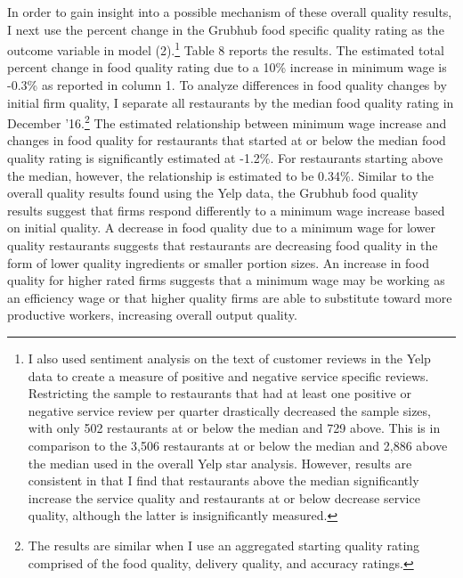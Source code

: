 \documentclass[11pt]{article}
\begin{document}
In order to gain insight into a possible mechanism of these overall quality results, I next use the percent change in the Grubhub food specific quality rating as the outcome variable in model (2).\footnote{I also used sentiment analysis on the text of customer reviews in the Yelp data to create a measure of positive and negative service specific reviews. Restricting the sample to restaurants that had at least one positive or negative service review per quarter drastically decreased the sample sizes, with only 502 restaurants at or below the median and 729 above. This is in comparison to the 3,506 restaurants at or below the median and 2,886 above the median used in the overall Yelp star analysis. However, results are consistent in that I find that restaurants above the median significantly increase the service quality and restaurants at or below decrease service quality, although the latter is insignificantly measured.} Table 8 reports the results. The estimated total percent change in food quality rating due to a 10\% increase in minimum wage is -0.3\% as reported in column 1. To analyze differences in food quality changes by initial firm quality, I separate all restaurants by the median food quality rating in December '16.\footnote{The results are similar when I use an aggregated starting quality rating comprised of the food quality, delivery quality, and accuracy ratings.} The estimated relationship between minimum wage increase and changes in food quality for restaurants that started at or below the median food quality rating is significantly estimated at -1.2\%. For restaurants starting above the median, however, the relationship is estimated to be 0.34\%. Similar to the overall quality results found using the Yelp data, the Grubhub food quality results suggest that firms respond differently to a minimum wage increase based on initial quality. A decrease in food quality due to a minimum wage for lower quality restaurants suggests that restaurants are decreasing food quality in the form of lower quality ingredients or smaller portion sizes. An increase in food quality for higher rated firms suggests that a minimum wage may be working as an efficiency wage or that higher quality firms are able to substitute toward more productive workers, increasing overall output quality. 
\end{document}
